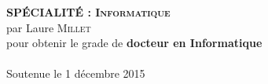 \begin{titlepage}
\begin{center}
\vspace*{0.2cm}
\noindent \large \textbf{SP\'ECIALIT\'E : \textsc{Informatique}}\\
\vspace*{0.4cm} \noindent \large {par} \LARGE Laure \textsc{Millet} \\
\vspace*{0.4cm} \noindent \Large pour obtenir le grade de
\textbf{docteur en Informatique}\\
\vspace*{0.6cm}
 \\
%
\vspace*{0.3cm}
\noindent \large Soutenue le 1 décembre 2015 \\
\end{center}


\end{titlepage}

